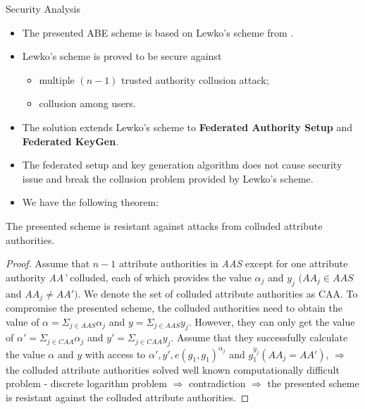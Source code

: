 \documentclass[11pt]{beamer}
\begin{document}
\begin{frame}[allowframebreaks]{Security Analysis}

\begin{itemize}
\item The presented ABE scheme is based on Lewko's scheme from \cite{lewkowaters}.
\item Lewko's scheme is proved to be secure against
	\begin{itemize}
	\item multiple $(n - 1)$ trusted authority collusion attack;
	\item collusion among users.
	\end{itemize}
\item The solution extends Lewko's scheme to \textbf{Federated Authority Setup} and \textbf{Federated KeyGen}.
\item The federated setup and key generation algorithm does not cause security issue and break the collusion problem provided by Lewko's scheme.
\item We have the following theorem:
\end{itemize}
\begin{theorem}
The presented scheme is resistant against attacks from colluded attribute authorities.
\end{theorem}
\framebreak
\begin{proof}
Assume that $n - 1$ attribute authorities in \textit{AAS} except for one attribute authority \textit{AA'} colluded, each of which provides the value $\alpha_j$ and $y_j$ $(AA_j \in AAS$ and $AA_j \not = AA')$. We denote the set of colluded attribute authorities as CAA. To compromise the presented scheme, the colluded authorities need to obtain the value of $\alpha = \Sigma_{j\in AAS}\alpha_j$ and $y = \Sigma_{j \in AAS}y_j$. However, they can only get the value of $\alpha' = \Sigma_{j \in CAA} \alpha_j$ and $y' = \Sigma_{j \in CAA}y_j$. Assume that they successfully calculate the value $\alpha$ and $y$ with access to $\alpha', y', e(g_1,g_1)^{\alpha_j}$ and $g_1^{y_j}(AA_j = AA')$, $\Rightarrow$ the colluded attribute authorities solved well known computationally difficult problem - discrete logarithm problem $\Rightarrow$ contradiction $\Rightarrow$ the presented scheme is resistant against the colluded attribute authorities.
\end{proof}

\end{frame}
\end{document}
